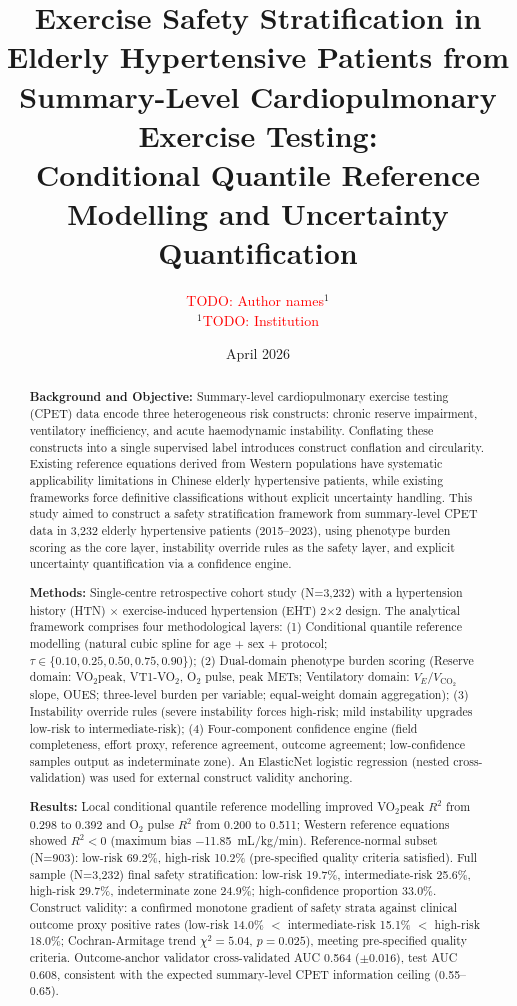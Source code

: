 \documentclass[12pt, a4paper]{article}
\title{\textbf{Exercise Safety Stratification in Elderly Hypertensive Patients
from Summary-Level Cardiopulmonary Exercise Testing:}\\
\large Conditional Quantile Reference Modelling and Uncertainty Quantification}
\author{\textcolor{red}{TODO: Author names}$^{1}$\\
\small$^{1}$\textcolor{red}{TODO: Institution}}
\date{April 2026}
\begin{document}
\maketitle

\begin{abstract}
\textbf{Background and Objective:}
Summary-level cardiopulmonary exercise testing (CPET) data encode three
heterogeneous risk constructs: chronic reserve impairment, ventilatory
inefficiency, and acute haemodynamic instability. Conflating these constructs
into a single supervised label introduces construct conflation and circularity.
Existing reference equations derived from Western populations have systematic
applicability limitations in Chinese elderly hypertensive patients, while existing
frameworks force definitive classifications without explicit uncertainty handling.
This study aimed to construct a safety stratification framework from summary-level
CPET data in 3,232 elderly hypertensive patients (2015--2023), using phenotype
burden scoring as the core layer, instability override rules as the safety layer,
and explicit uncertainty quantification via a confidence engine.

\textbf{Methods:}
Single-centre retrospective cohort study (N=3,232) with a hypertension history (HTN)
$\times$ exercise-induced hypertension (EHT) 2$\times$2 design. The analytical
framework comprises four methodological layers:
(1) Conditional quantile reference modelling (natural cubic spline for age
+ sex + protocol; $\tau \in \{0.10, 0.25, 0.50, 0.75, 0.90\}$);
(2) Dual-domain phenotype burden scoring (Reserve domain: VO$_2$peak, VT1-VO$_2$,
O$_2$ pulse, peak METs; Ventilatory domain: $V_E/V_{\text{CO}_2}$ slope, OUES;
three-level burden per variable; equal-weight domain aggregation);
(3) Instability override rules (severe instability forces high-risk;
mild instability upgrades low-risk to intermediate-risk);
(4) Four-component confidence engine (field completeness, effort proxy,
reference agreement, outcome agreement; low-confidence samples output as
indeterminate zone). An ElasticNet logistic regression (nested cross-validation)
was used for external construct validity anchoring.

\textbf{Results:}
Local conditional quantile reference modelling improved VO$_2$peak $R^2$
from 0.298 to 0.392 and O$_2$ pulse $R^2$ from 0.200 to 0.511;
Western reference equations showed $R^2 < 0$ (maximum bias $-$11.85~mL/kg/min).
Reference-normal subset (N=903): low-risk 69.2\%, high-risk 10.2\%
(pre-specified quality criteria satisfied).
Full sample (N=3,232) final safety stratification: low-risk 19.7\%,
intermediate-risk 25.6\%, high-risk 29.7\%, indeterminate zone 24.9\%;
high-confidence proportion 33.0\%.
Construct validity: a confirmed monotone gradient of safety strata against
clinical outcome proxy positive rates (low-risk 14.0\% $<$ intermediate-risk 15.1\%
$<$ high-risk 18.0\%; Cochran-Armitage trend $\chi^2 = 5.04$, $p = 0.025$),
meeting pre-specified quality criteria.
Outcome-anchor validator cross-validated AUC 0.564 ($\pm$0.016), test AUC 0.608,
consistent with the expected summary-level CPET information ceiling (0.55--0.65).


\end{abstract}
\end{document}
